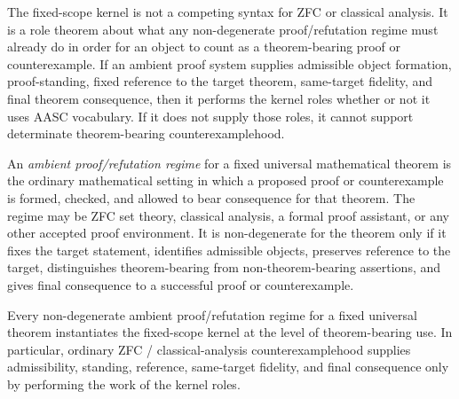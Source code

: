 \begin{tcolorbox}[breakable, title={Jurisdiction note: ambient proof systems do not escape the kernel}, colback=cyan!2!white, colframe=cyan!55!black]
The fixed-scope kernel is not a competing syntax for ZFC or classical analysis. It is a role theorem about what any non-degenerate proof/refutation regime must already do in order for an object to count as a theorem-bearing proof or counterexample. If an ambient proof system supplies admissible object formation, proof-standing, fixed reference to the target theorem, same-target fidelity, and final theorem consequence, then it performs the kernel roles whether or not it uses AASC vocabulary. If it does not supply those roles, it cannot support determinate theorem-bearing counterexamplehood.
\end{tcolorbox}

\begin{manualdefinition}
\label{def:ambient-proof-refutation-regime}
An \emph{ambient proof/refutation regime} for a fixed universal mathematical theorem is the ordinary mathematical setting in which a proposed proof or counterexample is formed, checked, and allowed to bear consequence for that theorem. The regime may be ZFC set theory, classical analysis, a formal proof assistant, or any other accepted proof environment. It is non-degenerate for the theorem only if it fixes the target statement, identifies admissible objects, preserves reference to the target, distinguishes theorem-bearing from non-theorem-bearing assertions, and gives final consequence to a successful proof or counterexample.
\end{manualdefinition}

\begin{manualtheorem}
\label{thm:ambient-proof-system-subsumption}
Every non-degenerate ambient proof/refutation regime for a fixed universal theorem instantiates the fixed-scope kernel at the level of theorem-bearing use. In particular, ordinary ZFC / classical-analysis counterexamplehood supplies admissibility, standing, reference, same-target fidelity, and final consequence only by performing the work of the kernel roles.
\end{manualtheorem}


